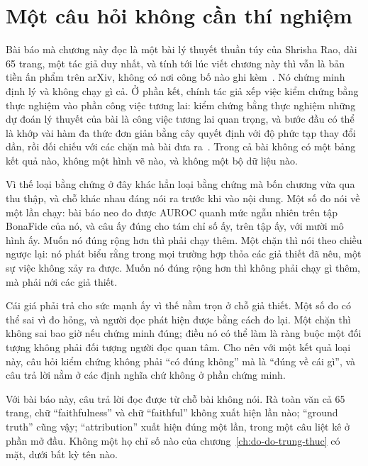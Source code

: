 \section{Một câu hỏi không cần thí nghiệm}
\label{sec:ch13-cau-hoi-khong-can-thi-nghiem}

%
Bài báo mà chương này đọc là một bài lý thuyết thuần túy của Shrisha Rao, dài 65
trang, một tác giả duy nhất, và tính tới lúc viết chương này thì vẫn là bản tiền
ấn phẩm trên arXiv, không có nơi công bố nào ghi
kèm~\autocite{p26limits}. Nó chứng minh định lý và
không chạy gì cả. Ở phần kết, chính tác giả xếp việc kiểm chứng bằng thực
nghiệm vào phần công việc tương lai: kiểm chứng bằng thực nghiệm những dự đoán
lý thuyết của bài là công việc tương lai quan trọng, và bước đầu có thể là khớp
vài hàm đa thức đơn giản bằng cây quyết định với độ phức tạp thay đổi dần, rồi
đối chiếu với các chặn mà bài đưa ra~\autocite{p26limits}. Trong cả bài không có
một bảng kết quả nào, không một hình vẽ nào, và không một bộ dữ liệu nào.

Vì thế loại bằng chứng ở đây khác hẳn loại bằng chứng mà bốn chương vừa qua thu
thập, và chỗ khác nhau đáng nói ra trước khi vào nội dung. Một số đo nói về một
lần chạy: bài báo neo đo được AUROC quanh mức ngẫu nhiên trên tập BonaFide của
nó, và câu ấy đúng cho tám chỉ số ấy, trên tập ấy, với mười mô hình ấy. Muốn nó
đúng rộng hơn thì phải chạy thêm. Một chặn thì nói theo chiều ngược lại: nó phát
biểu rằng trong mọi trường hợp thỏa các giả thiết đã nêu, một sự việc không xảy
ra được. Muốn nó đúng rộng hơn thì không phải chạy gì thêm, mà phải nới các giả
thiết.

Cái giá phải trả cho sức mạnh ấy vì thế nằm trọn ở chỗ giả thiết. Một số đo có thể sai
vì đo hỏng, và người đọc phát hiện được bằng cách đo lại. Một chặn thì không sai
bao giờ nếu chứng minh đúng; điều nó có thể làm là ràng buộc một đối tượng không
phải đối tượng người đọc quan tâm. Cho nên với một kết quả loại này, câu hỏi
kiểm chứng không phải \enquote{có đúng không} mà là \enquote{đúng về cái gì}, và
câu trả lời nằm ở các định nghĩa chứ không ở phần chứng minh.

%
Với bài báo này, câu trả lời đọc được từ chỗ bài không nói. Rà toàn văn cả 65
trang, chữ \enquote{faithfulness} và chữ \enquote{faithful} không xuất hiện lần
nào; \enquote{ground truth} cũng vậy; \enquote{attribution} xuất hiện đúng một
lần, trong một câu liệt kê ở phần mở đầu. Không một họ chỉ số nào của
chương~\ref{ch:do-do-trung-thuc} có mặt, dưới bất kỳ tên nào.


